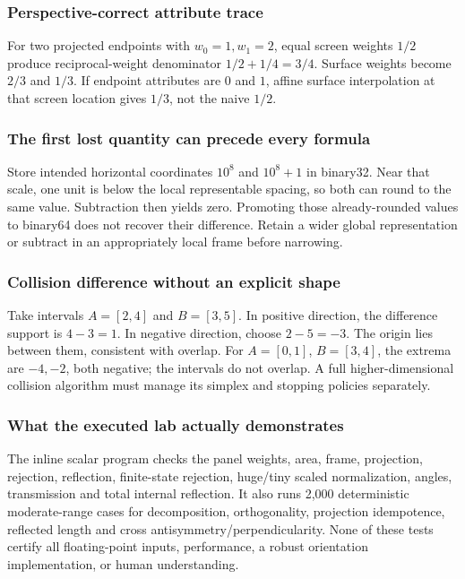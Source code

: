 \subsubsection{Perspective-correct attribute trace}\label{appendix-92ff77d4dfdc-perspective-correct-attribute-trace}

For two projected endpoints with \(w_0=1,w_1=2\), equal screen weights \(1/2\) produce reciprocal-weight denominator \(1/2+1/4=3/4\). Surface weights become \(2/3\) and \(1/3\). If endpoint attributes are \(0\) and \(1\), affine surface interpolation at that screen location gives \(1/3\), not the naive \(1/2\).

\subsubsection{The first lost quantity can precede every formula}\label{appendix-92ff77d4dfdc-the-first-lost-quantity-can-precede-every-formula}

Store intended horizontal coordinates \(10^8\) and \(10^8+1\) in binary32. Near that scale, one unit is below the local representable spacing, so both can round to the same value. Subtraction then yields zero. Promoting those already-rounded values to binary64 does not recover their difference. Retain a wider global representation or subtract in an appropriately local frame before narrowing.

\subsubsection{Collision difference without an explicit shape}\label{appendix-92ff77d4dfdc-collision-difference-without-an-explicit-shape}

Take intervals \(A=[2,4]\) and \(B=[3,5]\). In positive direction, the difference support is \(4-3=1\). In negative direction, choose \(2-5=-3\). The origin lies between them, consistent with overlap. For \(A=[0,1]\), \(B=[3,4]\), the extrema are \(-4,-2\), both negative; the intervals do not overlap. A full higher-dimensional collision algorithm must manage its simplex and stopping policies separately.

\subsubsection{What the executed lab actually demonstrates}\label{appendix-92ff77d4dfdc-what-the-executed-lab-actually-demonstrates}

The inline scalar program checks the panel weights, area, frame, projection, rejection, reflection, finite-state rejection, huge/tiny scaled normalization, angles, transmission and total internal reflection. It also runs 2,000 deterministic moderate-range cases for decomposition, orthogonality, projection idempotence, reflected length and cross antisymmetry/perpendicularity. None of these tests certify all floating-point inputs, performance, a robust orientation implementation, or human understanding.

